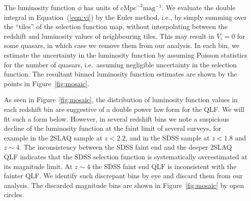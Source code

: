 \documentclass[fleqn,usenatbib]{mnras}
\begin{document}
The luminosity function $\phi$ has units of
$\mathrm{cMpc}^{-3}\mathrm{mag}^{-1}$.  We evaluate the double
integral in Equation~(\ref{eqn:vi}) by the Euler method, i.e., by
simply summing over the ``tiles'' of the selection function map,
without interpolating between the redshift and luminosity values of
neighbouring tiles. 
This may result in $V_i=0$ for some quasars, in
which case we remove them from our analysis.
In each bin, we estimate the uncertainty in the luminosity function by
assuming Poisson statistics \citep{1986ApJ...303..336G} for the number
of quasars, i.e.\ assuming negligible uncertainty in the selection function.
The resultant binned luminosity function estimates are shown by the
points in Figure~\ref{fig:mosaic}.

As seen in Figure~\ref{fig:mosaic}, the distribution of luminosity
function values in each redshift bin are suggestive of a double power
law form for the QLF.  We will fit such a form below. 
However, in several redshift bins we note a suspicious decline of the
luminosity function at the faint limit of several surveys, for example in
the 2SLAQ sample at $z<2.2$, and in the SDSS sample at $z<1.8$ and $z\sim 4$.
The inconsistency between the SDSS faint end and the deeper
2SLAQ QLF indicates that the SDSS selection function is
systematically overestimated at its magnitude limit.
At $z\sim 4$ the SDSS faint end QLF is inconsistent with the fainter
\citet{2011ApJ...728L..26G} QLF. We identify such discrepant bins
by eye and discard them from our analysis.
The discarded magnitude bins are shown in Figure~\ref{fig:mosaic} by open circles.
\end{document}
